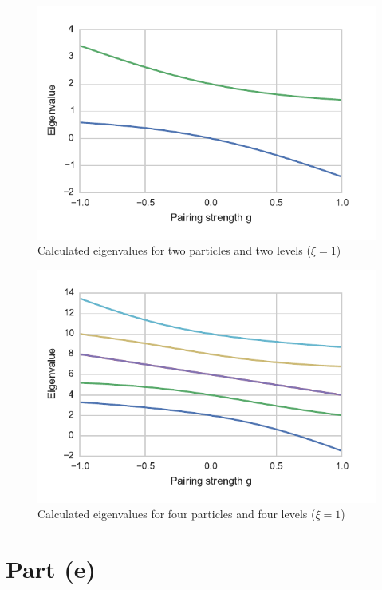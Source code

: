 \documentclass{article}
\begin{document}
	\begin{figure}[p]
		\centering
		\includegraphics{calc2.pdf}
		\caption{Calculated eigenvalues for two particles and two levels ($\xi=1$)}
		\label{fig:2lev_calc}
	\end{figure}

	\begin{figure}[p]
		\centering
		\includegraphics{calc4.pdf}
		\caption{Calculated eigenvalues for four particles and four levels ($\xi=1$)}
		\label{fig:4lev_calc}
	\end{figure}

\section*{Part (e)}
\end{document}
